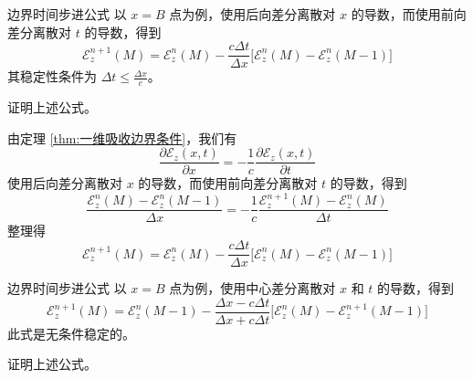 \begin{theorem}{边界时间步进公式}
    以 $x=B$ 点为例，使用后向差分离散对 $x$ 的导数，而使用前向差分离散对 $t$ 的导数，得到
    \begin{equation}
        \mathscr{E}_z^{n+1}(M)=\mathscr{E}_z^{n}(M)
        -\frac{c\Delta t}{\Delta x}
        \Big[\mathscr{E}_z^{n}(M)-\mathscr{E}_z^{n}(M-1)\Big]
    \end{equation}
    其稳定性条件为 $\Delta t \leq \frac{\Delta x}{c}$。
\end{theorem}

\begin{exercise}
    证明上述公式。
\end{exercise}

\begin{solution}
    由定理 \ref{thm:一维吸收边界条件}，我们有
    \begin{equation*}
        \frac{\partial \mathscr{E}_z(x,t)}{\partial x}
        =-\frac{1}{c}\frac{\partial \mathscr{E}_z(x,t)}{\partial t}
    \end{equation*}
    使用后向差分离散对 $x$ 的导数，而使用前向差分离散对 $t$ 的导数，得到
    \begin{equation*}
        \frac{\mathscr{E}_z^{n}(M)-\mathscr{E}_z^{n}(M-1)}{\Delta x}
        =-\frac{1}{c}\frac{\mathscr{E}_z^{n+1}(M)-\mathscr{E}_z^{n}(M)}{\Delta t}
    \end{equation*}
    整理得
    \begin{equation*}
        \mathscr{E}_z^{n+1}(M)=\mathscr{E}_z^{n}(M)
        -\frac{c\Delta t}{\Delta x}
        \Big[\mathscr{E}_z^{n}(M)-\mathscr{E}_z^{n}(M-1)\Big]
    \end{equation*}
\end{solution}

\begin{theorem}{边界时间步进公式}
    以 $x=B$ 点为例，使用中心差分离散对 $x$ 和 $t$ 的导数，得到
    \begin{equation}
        \mathscr{E}_z^{n+1}(M)=\mathscr{E}_z^{n}(M-1)
        -\frac{\Delta x-c\Delta t}{\Delta x + c\Delta t}
        \Big[\mathscr{E}_z^{n}(M)-\mathscr{E}_z^{n+1}(M-1)\Big]
    \end{equation}
    此式是无条件稳定的。
\end{theorem}

\begin{exercise}
    证明上述公式。
\end{exercise}

